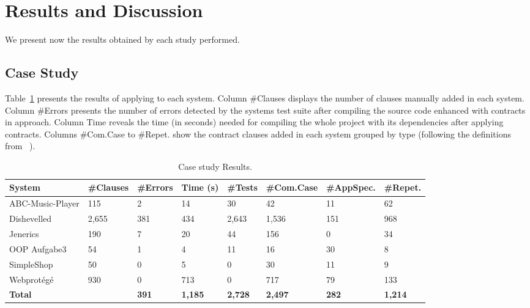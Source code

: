 \section{Results and Discussion}
\label{results}

We present now the results obtained by each study performed. 

\subsection{Case Study}

Table~\ref{tab:caseStudyResults} presents the results of applying \contractjdoc{} to each system.
Column \#Clauses displays the number of clauses manually added in each system.
Column \#Errors presents the number of errors detected by the systems test suite after compiling the source code enhanced with contracts in
\contractjdoc{} approach. Column Time reveals the time (in seconds) needed for compiling the whole
project with its dependencies after applying \contractjdoc{} contracts. Columns \#Com.Case to \#Repet.
show the contract clauses added in each system grouped by type (following the
definitions from ~\cite{typeContracts}).

\begin{table}[h]
\caption{Case study Results.}
\label{tab:caseStudyResults}
\centering
\begin{tabular}{l l l l l l l l}
\hline
 \bfseries System &
 \bfseries \#Clauses & 
 \bfseries \#Errors & 
 \bfseries Time (s) &
 \bfseries \#Tests &
 \bfseries \#Com.Case &
 \bfseries \#AppSpec. &
 \bfseries \#Repet. \\ \hline
ABC-Music-Player & 115 & 2 & 14 & 30 & 42 & 11 & 62 \\
Dishevelled & 2,655 & 381 & 434 & 2,643 & 1,536 & 151 & 968 \\
Jenerics & 190 & 7 & 20 & 44 & 156 & 0 & 34 \\
OOP Aufgabe3 & 54 & 1 & 4 & 11 & 16 & 30 & 8 \\
SimpleShop & 50 & 0 & 5 & 0 & 30 & 11 & 9 \\
Webprot\'{e}g\'{e} & 930 & 0 & 713 & 0 & 717 & 79 & 133 \\ \hline

 \bfseries Total & 
 \bfseries \totalClauses{} & 
 \bfseries 391 &
 \bfseries 1,185 &
 \bfseries 2,728 &
 \bfseries 2,497 &
 \bfseries 282 &
 \bfseries 1,214
\\
\bottomrule
\end{tabular}
\end{table}

